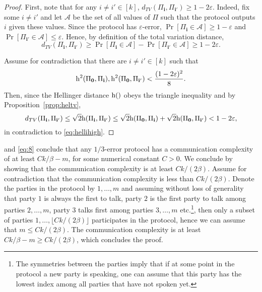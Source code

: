 \begin{proof}
First, note that for any $i\ne i' \in [k]$, $d_{TV}(\Pi_{\mathbf{i}}, \Pi_{\mathbf{i'}}) \ge 1 - 2\varepsilon$. Indeed, fix some $i \ne i'$ and let $\mathcal{A}$ be the set of all values of $\Pi$ such that the protocol outputs $i$ given these values. Since the protocol has $\varepsilon$-error, $\Pr\left[ \Pi_{\mathbf{i}}\in \mathcal{A}\right] \ge 1 - \varepsilon$ and $\Pr\left[\Pi_{\mathbf{i'}}\in \mathcal{A}\right] \le \varepsilon$. Hence, by definition of the total variation distance,
\begin{equation} \label{eq:hellihigh}
d_{TV}(\Pi_{\mathbf{i}}, \Pi_{\mathbf{i'}})
\ge \Pr\left[ \Pi_{\mathbf{i}}\in \mathcal{A}\right] - \Pr\left[\Pi_{\mathbf{i'}}\in \mathcal{A}\right]
\ge 1-2\varepsilon.
\end{equation}

Assume for contradiction that there are $i \ne i' \in [k]$ such that 
\[
\mathrm{h}^2(\Pi_{\mathbf{0}}, \Pi_{\mathbf{i}}), \mathrm{h}^2(\Pi_{\mathbf{0}}, \Pi_{\mathbf{i'}}) 
< \frac{(1-2\varepsilon)^2}{8}.
\]
Then, since the Hellinger distance $\mathrm{h}()$ obeys the triangle inequality and by Proposition~\ref{prop:heltv},
\[
d_{TV}(\Pi_{\mathbf{i}}, \Pi_{\mathbf{i'}})
\le \sqrt{2} \mathrm{h}(\Pi_{\mathbf{i}}, \Pi_{\mathbf{i'}})
\le \sqrt{2}\mathrm{h}(\Pi_{\mathbf{0}}, \Pi_{\mathbf{i}}) + \sqrt{2}\mathrm{h}(\Pi_{\mathbf{0}}, \Pi_{\mathbf{i'}}) 
< 1-2\varepsilon,
\]
in contradiction to \eqref{eq:hellihigh}.
\end{proof}

 and \eqref{eq:8} conclude that any $1/3$-error protocol has a communication complexity of at least $Ck/\beta - m$, for some numerical constant $C>0$. We conclude by showing that the communication complexity is at least $Ck/(2\beta)$. Assume for contradiction that the communication complexity is less than $Ck/(2\beta)$. Denote the parties in the protocol by $1,\dots, m$ and assuming without loss of generality that party $1$ is always the first to talk, party $2$ is the first party to talk among parties $2,\dots,m$,  party $3$ talks first among parties $3, \dots, m$ etc.\footnote{The symmetries between the parties imply that if at some point in the protocol a new party is speaking, one can assume that this party has the lowest index among all parties that have not spoken yet.}, then only a subset of parties $1, \dots, \lfloor Ck/(2\beta) \rfloor$ participates in the protocol, hence we can assume that $m \le Ck/(2\beta)$. The communication complexity is at least $Ck/\beta-m \ge Ck/(2\beta)$, which concludes the proof.
